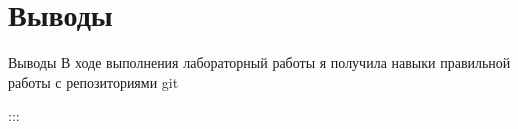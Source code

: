 \documentclass[
  ignorenonframetext,
  aspectratio=169,
  russian,
]{beamer}
\begin{document}
\section{Выводы}\label{ux432ux44bux432ux43eux434ux44b}

\begin{frame}{Выводы}
В ходе выполнения лабораторный работы я получила навыки правильной
работы с репозиториями git

:::
\end{frame}
\end{document}
